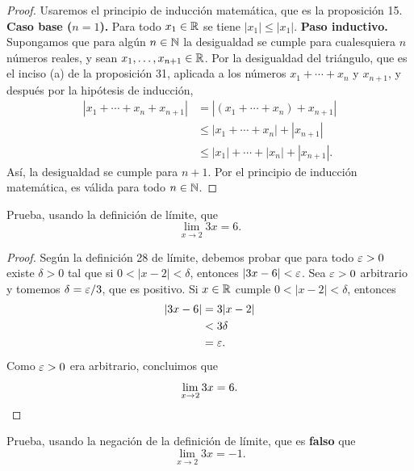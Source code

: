 \documentclass[12pt,a4paper]{article}
\begin{document}
    \begin{proof}
        Usaremos el principio de inducción matemática, que es la proposición 15.
        \textbf{Caso base ($n=1$).} Para todo $x_{1}\in\mathbb{R}$ se tiene $|x_{1}|\leq|x_{1}|$.
        \textbf{Paso inductivo.} Supongamos que para algún $n\in\mathbb{N}$ la desigualdad se cumple para cualesquiera $n$ números reales, y sean $x_{1},\ldots,x_{n+1}\in\mathbb{R}$. Por la desigualdad del triángulo, que es el inciso (a) de la proposición 31, aplicada a los números $x_{1}+\cdots+x_{n}$ y $x_{n+1}$, y después por la hipótesis de inducción,
        \begin{align*}
            \left|x_{1}+\cdots+x_{n}+x_{n+1}\right|&=\left|\left(x_{1}+\cdots+x_{n}\right)+x_{n+1}\right|\\
            &\leq\left|x_{1}+\cdots+x_{n}\right|+\left|x_{n+1}\right|\\
            &\leq\left|x_{1}\right|+\cdots+\left|x_{n}\right|+\left|x_{n+1}\right|.
        \end{align*}
        Así, la desigualdad se cumple para $n+1$. Por el principio de inducción matemática, es válida para todo $n\in\mathbb{N}$.
    \end{proof}

    \begin{problema}
        Prueba, usando la definición de límite, que
        \begin{equation*}
            \lim_{x\to2}3x=6.
        \end{equation*}
    \end{problema}

    \begin{proof}
        Según la definición 28 de límite, debemos probar que para todo $\varepsilon>0$ existe $\delta>0$ tal que si $0<|x-2|<\delta$, entonces $|3x-6|<\varepsilon$. Sea $\varepsilon>0$ arbitrario y tomemos $\delta=\varepsilon/3$, que es positivo. Si $x\in\mathbb{R}$ cumple $0<|x-2|<\delta$, entonces
        \begin{align*}
            |3x-6|&=3|x-2|\\
            &<3\delta\\
            &=\varepsilon.
        \end{align*}
        Como $\varepsilon>0$ era arbitrario, concluimos que
        \begin{equation*}
            \lim_{x\to2}3x=6.\qedhere
        \end{equation*}
    \end{proof}

    \begin{problema}
        Prueba, usando la negación de la definición de límite, que es \textbf{falso} que
        \begin{equation*}
            \lim_{x\to2}3x=-1.
        \end{equation*}
    \end{problema}
\end{document}
